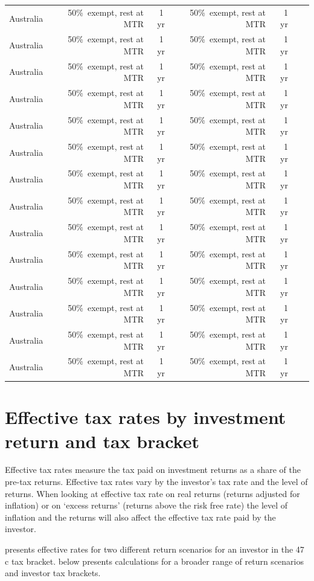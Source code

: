\documentclass{grattan}\usepackage[]{graphicx}\usepackage[]{color}
\begin{document}
\begin{longtable}{lrrrrrr}
 Australia & 50\%\ exempt, rest at MTR & 1\,yr & 50\%\ exempt, rest at MTR & 1 yr \\ 
 Australia & 50\%\ exempt, rest at MTR & 1\,yr & 50\%\ exempt, rest at MTR & 1 yr \\ 
 Australia & 50\%\ exempt, rest at MTR & 1\,yr & 50\%\ exempt, rest at MTR & 1 yr \\ 
 Australia & 50\%\ exempt, rest at MTR & 1\,yr & 50\%\ exempt, rest at MTR & 1 yr \\ 
 Australia & 50\%\ exempt, rest at MTR & 1\,yr & 50\%\ exempt, rest at MTR & 1 yr \\ 
 Australia & 50\%\ exempt, rest at MTR & 1\,yr & 50\%\ exempt, rest at MTR & 1 yr \\ 
 Australia & 50\%\ exempt, rest at MTR & 1\,yr & 50\%\ exempt, rest at MTR & 1 yr \\ 
 Australia & 50\%\ exempt, rest at MTR & 1\,yr & 50\%\ exempt, rest at MTR & 1 yr \\ 
 Australia & 50\%\ exempt, rest at MTR & 1\,yr & 50\%\ exempt, rest at MTR & 1 yr \\ 
 Australia & 50\%\ exempt, rest at MTR & 1\,yr & 50\%\ exempt, rest at MTR & 1 yr \\ 
 Australia & 50\%\ exempt, rest at MTR & 1\,yr & 50\%\ exempt, rest at MTR & 1 yr \\ 
 Australia & 50\%\ exempt, rest at MTR & 1\,yr & 50\%\ exempt, rest at MTR & 1 yr \\ 
 Australia & 50\%\ exempt, rest at MTR & 1\,yr & 50\%\ exempt, rest at MTR & 1 yr \\ 
 Australia & 50\%\ exempt, rest at MTR & 1\,yr & 50\%\ exempt, rest at MTR & 1 yr \\ 
\end{longtable}
\renewcommand{\arraystretch}{1.0}
\twocolumn
\chapter{Effective tax rates by investment return and tax bracket}
Effective tax rates measure the tax paid on investment returns as a share of the pre-tax returns. Effective tax rates vary by the investor’s tax rate and the level of returns. When looking at effective tax rate on real returns (returns adjusted for inflation) or on `excess returns' (returns above the risk free rate) the level of inflation and the returns will also affect the effective tax rate paid by the investor. 

 presents effective rates for two different return scenarios for an investor in the 47\,c tax bracket.  below presents calculations for a broader range of return scenarios and investor tax brackets. 
\end{document}
